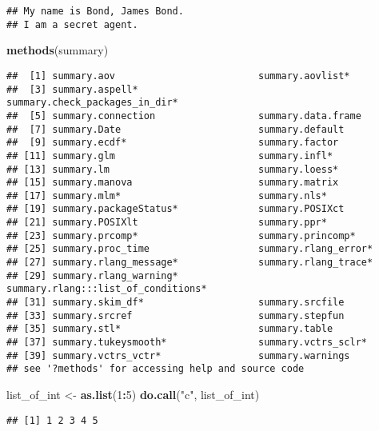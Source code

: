 \documentclass[]{article}
\newenvironment{Shaded}{\begin{snugshade}}{\end{snugshade}}
\newcommand{\DecValTok}[1]{\textcolor[rgb]{0.00,0.00,0.81}{#1}}
\newcommand{\KeywordTok}[1]{\textcolor[rgb]{0.13,0.29,0.53}{\textbf{#1}}}
\newcommand{\NormalTok}[1]{#1}
\newcommand{\OperatorTok}[1]{\textcolor[rgb]{0.81,0.36,0.00}{\textbf{#1}}}
\newcommand{\StringTok}[1]{\textcolor[rgb]{0.31,0.60,0.02}{#1}}
\begin{document}
\begin{verbatim}
## My name is Bond, James Bond.
## I am a secret agent.
\end{verbatim}

\begin{Shaded}
\begin{Highlighting}[]
\KeywordTok{methods}\NormalTok{(summary)}
\end{Highlighting}
\end{Shaded}

\begin{verbatim}
##  [1] summary.aov                         summary.aovlist*                   
##  [3] summary.aspell*                     summary.check_packages_in_dir*     
##  [5] summary.connection                  summary.data.frame                 
##  [7] summary.Date                        summary.default                    
##  [9] summary.ecdf*                       summary.factor                     
## [11] summary.glm                         summary.infl*                      
## [13] summary.lm                          summary.loess*                     
## [15] summary.manova                      summary.matrix                     
## [17] summary.mlm*                        summary.nls*                       
## [19] summary.packageStatus*              summary.POSIXct                    
## [21] summary.POSIXlt                     summary.ppr*                       
## [23] summary.prcomp*                     summary.princomp*                  
## [25] summary.proc_time                   summary.rlang_error*               
## [27] summary.rlang_message*              summary.rlang_trace*               
## [29] summary.rlang_warning*              summary.rlang:::list_of_conditions*
## [31] summary.skim_df*                    summary.srcfile                    
## [33] summary.srcref                      summary.stepfun                    
## [35] summary.stl*                        summary.table                      
## [37] summary.tukeysmooth*                summary.vctrs_sclr*                
## [39] summary.vctrs_vctr*                 summary.warnings                   
## see '?methods' for accessing help and source code
\end{verbatim}

\begin{Shaded}
\begin{Highlighting}[]
\NormalTok{list_of_int <-}\StringTok{ }\KeywordTok{as.list}\NormalTok{(}\DecValTok{1}\OperatorTok{:}\DecValTok{5}\NormalTok{)}
\KeywordTok{do.call}\NormalTok{(}\StringTok{"c"}\NormalTok{, list_of_int)}
\end{Highlighting}
\end{Shaded}

\begin{verbatim}
## [1] 1 2 3 4 5
\end{verbatim}
\end{document}
